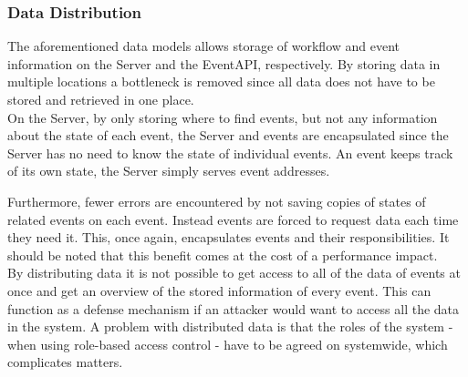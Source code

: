 \subsubsection{Data Distribution}
The aforementioned data models allows storage of workflow and event information on the Server and the EventAPI, respectively. By storing data in multiple locations a bottleneck is removed since all data does not have to be stored and retrieved in one place. \\

On the Server, by only storing where to find events, but not any information about the state of each event, the Server and events are encapsulated since the Server has no need to know the state of individual events. An event keeps track of its own state, the Server simply serves event addresses. 

Furthermore, fewer errors are encountered by not saving copies of states of related events on each event. Instead events are forced to request data each time they need it. This, once again, encapsulates events and their responsibilities. It should be noted that this benefit comes at the cost of a performance impact.\\

By distributing data it is not possible to get access to all of the data of events at once and get an overview of the stored information of every event. This can function as a defense mechanism if an attacker would want to access all the data in the system. 
A problem with distributed data is that the roles of the system - when using role-based access control - have to be agreed on systemwide, which complicates matters. 